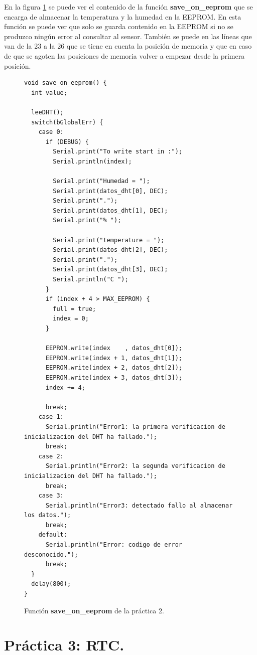 \documentclass{article}
\begin{document}
	En la figura \ref{cod:p2:save_on_eeprom} se puede ver el contenido de la función \textbf{save\_on\_eeprom} que se encarga de almacenar la temperatura y la humedad en la EEPROM. En esta función se puede ver que solo se guarda contenido en la EEPROM si no se produzco ningún error al consultar al sensor. También se puede en las líneas que van de la 23 a la 26 que se tiene en cuenta la posición de memoria y que en caso de que se agoten las posiciones de memoria volver a empezar desde la primera posición.

\begin{figure}[h]
	\begin{lstlisting}[style=c]
void save_on_eeprom() {
  int value;
  
  leeDHT();
  switch(bGlobalErr) {
    case 0:
      if (DEBUG) {
        Serial.print("To write start in :");
        Serial.println(index);
        
        Serial.print("Humedad = ");
        Serial.print(datos_dht[0], DEC);
        Serial.print(".");
        Serial.print(datos_dht[1], DEC);
        Serial.print("% ");
      
        Serial.print("temperature = ");
        Serial.print(datos_dht[2], DEC);
        Serial.print(".");
        Serial.print(datos_dht[3], DEC);
        Serial.println("C ");
      }
      if (index + 4 > MAX_EEPROM) {
        full = true;
        index = 0; 
      }
      
      EEPROM.write(index    , datos_dht[0]);
      EEPROM.write(index + 1, datos_dht[1]);
      EEPROM.write(index + 2, datos_dht[2]);
      EEPROM.write(index + 3, datos_dht[3]);
      index += 4;
      
      break;  
    case 1:
      Serial.println("Error1: la primera verificacion de inicializacion del DHT ha fallado.");
      break;
    case 2:
      Serial.println("Error2: la segunda verificacion de inicializacion del DHT ha fallado.");
      break;
    case 3:
      Serial.println("Error3: detectado fallo al almacenar los datos.");
      break;
    default:
      Serial.println("Error: codigo de error desconocido.");
      break;
  }
  delay(800);
}
	\end{lstlisting}
	\caption{Función \textbf{save\_on\_eeprom} de la práctica 2.}
	\label{cod:p2:save_on_eeprom}
\end{figure}

\clearpage

\section{Práctica 3: RTC.}
\end{document}
